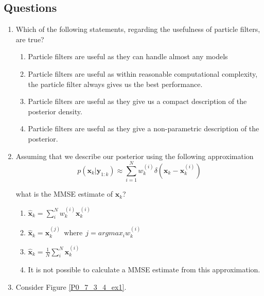 \subsection{Questions}
\label{questions_particle_filters}

\begin{enumerate}
\item Which of the following statements, regarding the usefulness of particle filters, are true?


\begin{enumerate}
\item Particle filters are useful as they can handle almost any models
\item Particle filters are useful as within reasonable computational complexity, the particle filter always gives us the best performance. 
\item Particle filters are useful as they give us a compact description of the posterior density. 
\item Particle filters are useful as they give a non-parametric description of the posterior.
\end{enumerate}
\item Assuming that we describe our posterior using the following approximation
\begin{equation}
p(\mathbf{x}_k | \mathbf{y}_{1:k}) \approx \sum_{i=1}^N w_{k}^{(i)} \delta (\mathbf{x}_k -\mathbf{x}_{k}^{(i)})
\end{equation}

what is the MMSE estimate of $\mathbf{x}_k$?
\begin{enumerate}
\item $\hat{\mathbf{x}}_k = \sum_{i}^{N} w_{k}^{(i)} \mathbf{x}_{k}^{(i)}$
\item $\hat{\mathbf{x}}_k = \mathbf{x}_{k}^{(j)} ~~ \text{where} ~~ j = argmax_i w_{k}^{(i)}$
\item $\hat{\mathbf{x}}_k = \frac{1}{N}\sum_{i}^{N}  \mathbf{x}_{k}^{(i)}$
\item It is not possible to calculate a MMSE estimate from this approximation. 
\end{enumerate}
\item Consider Figure \ref{P0_7_3_4_ex1}.


\end{enumerate}
